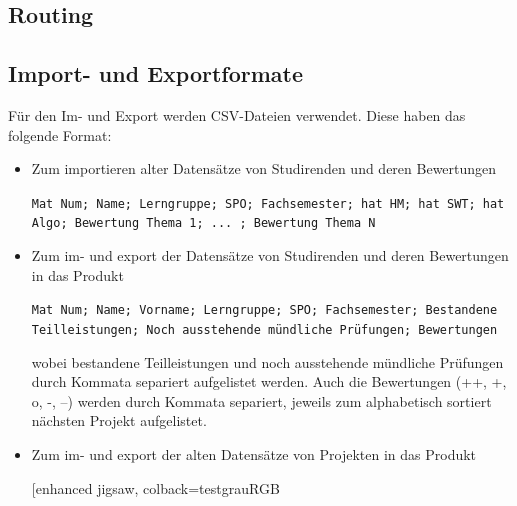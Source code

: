 \documentclass[parskip=full]{scrartcl}
\begin{document}
\subsection{Routing}


\subsection{Import- und Exportformate}
Für den Im- und Export werden CSV-Dateien verwendet. Diese haben das folgende
Format: 
\begin{itemize}
  \item Zum importieren alter Datensätze von Studirenden und deren Bewertungen
 \\ \begin{tcolorbox}[enhanced jigsaw, %
 colback=testgrauRGB %
 coltext=black, %
 sharp corners, %
 colframe=black, %
 boxrule=0pt %
 ]
 \texttt{Mat Num; Name; Lerngruppe; SPO;
  Fachsemester; hat HM; hat SWT; hat Algo; Bewertung Thema 1; ... ; Bewertung
  Thema N}
  \end{tcolorbox}
   \item Zum im- und export der Datensätze von Studirenden und deren
   Bewertungen in das Produkt \\ \begin{tcolorbox}[enhanced jigsaw, %
 colback=testgrauRGB %
 coltext=black, %
 sharp corners, %
 colframe=black, %
 boxrule=0pt %
 ]
 \texttt{Mat Num; Name; Vorname; Lerngruppe; SPO; Fachsemester; Bestandene
 Teilleistungen; Noch ausstehende mündliche Prüfungen; Bewertungen}
  \end{tcolorbox}
   wobei bestandene Teilleistungen und noch ausstehende mündliche Prüfungen durch
  Kommata separiert aufgelistet werden. Auch die Bewertungen (++, +, o, -, --)
  werden durch Kommata separiert, jeweils zum alphabetisch sortiert nächsten
  Projekt aufgelistet.
  \item Zum im- und export der alten Datensätze von Projekten in das Produkt
  \\
  \begin{tcolorbox}[enhanced jigsaw, %
 colback=testgrauRGB %

\end{tcolorbox}
\end{itemize}
\end{document}

